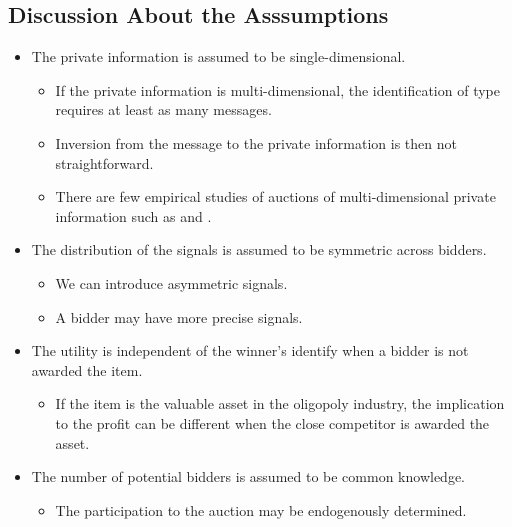 \documentclass[
]{book}
\providecommand{\tightlist}{%
  \setlength{\itemsep}{0pt}\setlength{\parskip}{0pt}}
\begin{document}
\hypertarget{discussion-about-the-asssumptions}{%
\subsection{Discussion About the Asssumptions}\label{discussion-about-the-asssumptions}}

\begin{itemize}
\tightlist
\item
  The private information is assumed to be single-dimensional.

  \begin{itemize}
  \tightlist
  \item
    If the private information is multi-dimensional, the identification of type requires at least as many messages.
  \item
    Inversion from the message to the private information is then not straightforward.
  \item
    There are few empirical studies of auctions of multi-dimensional private information such as \citet{bajariBiddingIncompleteContracts2014} and \citet{takahashiStrategicDesignUncertain2018}.
  \end{itemize}
\item
  The distribution of the signals is assumed to be symmetric across bidders.

  \begin{itemize}
  \tightlist
  \item
    We can introduce asymmetric signals.
  \item
    A bidder may have more precise signals.
  \end{itemize}
\item
  The utility is independent of the winner's identify when a bidder is not awarded the item.

  \begin{itemize}
  \tightlist
  \item
    If the item is the valuable asset in the oligopoly industry, the implication to the profit can be different when the close competitor is awarded the asset.
  \end{itemize}
\item
  The number of potential bidders is assumed to be common knowledge.

  \begin{itemize}
  \tightlist
  \item
    The participation to the auction may be endogenously determined.
  \end{itemize}
\end{itemize}
\end{document}
